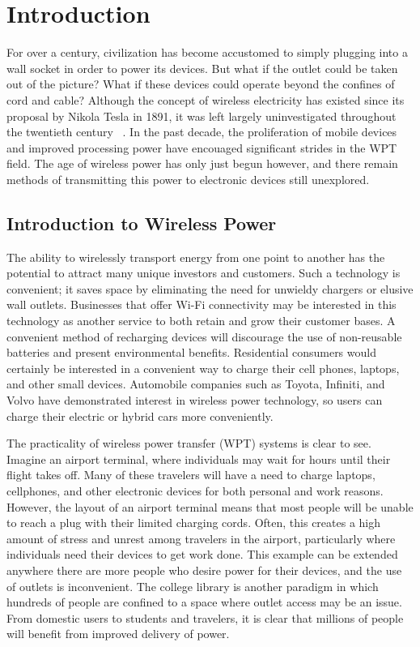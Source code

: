 \chapter{Introduction}
\label{ch:introduction}

For over a century, civilization has become accustomed to simply plugging into a wall socket in order to power its devices. But what if the outlet could be taken out of the picture? What if these devices could operate beyond the confines of cord and cable? Although the concept of wireless electricity has existed since its proposal by Nikola Tesla in 1891, it was left largely uninvestigated throughout the twentieth century ~\cite{NikkiT}. In the past decade, the proliferation of mobile devices and improved processing power have encouaged significant strides in the WPT field. The age of wireless power has only just begun however, and there remain methods of transmitting this power to electronic devices still unexplored.

\section{Introduction to Wireless Power}
The ability to wirelessly transport energy from one point to another has the potential to attract many unique investors and customers. Such a technology is convenient; it saves space by eliminating the need for unwieldy chargers or elusive wall outlets. Businesses that offer Wi-Fi connectivity may be interested in this technology as another service to both retain and grow their customer bases. A convenient method of recharging devices will discourage the use of non-reusable batteries and present environmental benefits. Residential consumers would certainly be interested in a convenient way to charge their cell phones, laptops, and other small devices. Automobile companies such as Toyota, Infiniti, and Volvo have demonstrated interest in wireless power technology, so users can charge their electric or hybrid cars more conveniently. 

The practicality of wireless power transfer (WPT) systems is clear to see. Imagine an airport terminal, where individuals may wait for hours until their flight takes off. Many of these travelers will have a need to charge laptops, cellphones, and other electronic devices for both personal and work reasons. However, the layout of an airport terminal means that most people will be unable to reach a plug with their limited charging cords. Often, this creates a high amount of stress and unrest among travelers in the airport, particularly where individuals need their devices to get work done. This example can be extended anywhere there are more people who desire power for their devices, and the use of outlets is inconvenient. The college library is another paradigm in which hundreds of people are confined to a space where outlet access may be an issue. From domestic users to students and travelers, it is clear that millions of people will benefit from improved delivery of power.

